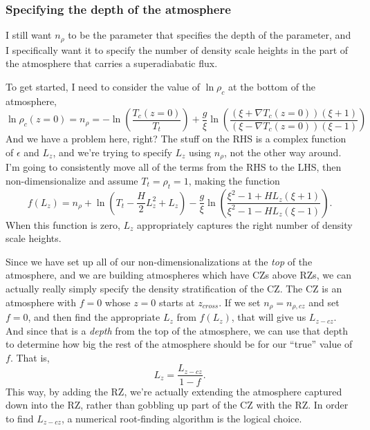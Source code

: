 \documentclass[aps, pre, onecolumn, nofootinbib, notitlepage, groupedaddress, amsfonts, amssymb, amsmath, longbibliography]{revtex4-1}
\newcommand{\grad}{\ensuremath{\nabla}}
\begin{document}
\subsubsection{Specifying the depth of the atmosphere}
I still want $n_\rho$ to be the parameter that specifies the depth of the parameter,
and I specifically want it to specify the number of density scale heights in the part of the
atmosphere that carries a superadiabatic flux.  

To get started, I need to consider the value of $\ln\rho_c$ at the bottom of the atmosphere,
$$
\ln\rho_c(z=0) = n_\rho = -\ln\left(\frac{T_c(z=0)}{T_t}\right)
+ \frac{g}{\xi}\ln\left(\frac{(\xi + \grad T_c(z=0))(\xi + 1)}{(\xi - \grad T_c(z=0))(\xi - 1)}\right)
$$
And we have a problem here, right?  The stuff on the RHS is a complex function of $\epsilon$ and
$L_z$, and we're trying to specify $L_z$ using $n_\rho$, not the other way around.
I'm going to consistently move all of the terms from the RHS to the LHS, then
non-dimensionalize and assume $T_t = \rho_t = 1$, making the function
\begin{equation}
f(L_{z}) = n_\rho + \ln\left(T_t - \frac{H}{2}L_z^2 + L_z\right) - 
\frac{g}{\xi}\ln\left(\frac{\xi^2 - 1 + HL_z(\xi + 1)}{\xi^2 - 1 - HL_z(\xi - 1)}\right).
\end{equation}
When this function is zero, $L_z$ appropriately captures the right number of density scale heights.

Since we have set up all of our non-dimensionalizations at the \emph{top} of the atmosphere, and we
are building atmospheres which have CZs above RZs, we can actually really simply specify the
density stratification of the CZ.  The CZ is an atmosphere with $f = 0$ whose $z = 0$ starts
at $z_{cross}$.  If we set $n_\rho = n_{\rho, cz}$ and set $f = 0$, and then find the appropriate
$L_z$ from $f(L_z)$, that will give us $L_{z-cz}$.  And since that is a \emph{depth} from
the top of the atmosphere, we can use that depth to determine how big the rest of the
atmosphere should be for our ``true'' value of $f$. That is,
\begin{equation}
L_z = \frac{L_{z-cz}}{1 - f}.
\end{equation}
This way, by adding the RZ, we're actually extending the atmosphere captured down into the RZ,
rather than gobbling up part of the CZ with the RZ.  In order to find $L_{z-cz}$, a
numerical root-finding algorithm is the logical choice.
\end{document}
